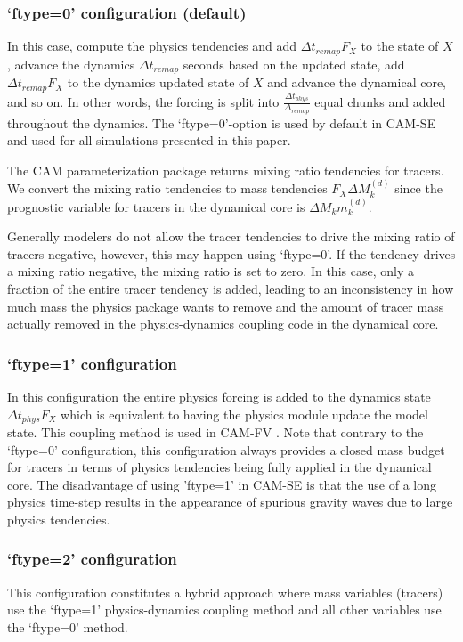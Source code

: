 \documentclass{agujournal}
\begin{document}
{\subsubsection{`ftype=0' configuration (default)}
In this case, compute the physics tendencies and add $\Delta t_{remap}F_X$ to the state of $X$, advance the dynamics $\Delta t_{remap}$ seconds based on the updated state, add $\Delta t_{remap}F_X$ to the dynamics updated state of $X$ and advance the dynamical core, and so on. In other words, the forcing is split into $\frac{\Delta t_{phys}}{\Delta_{remap}}$ equal chunks and added throughout the dynamics. The `ftype=0'-option is used by default in CAM-SE and used for all simulations presented in this paper.

The CAM parameterization package returns mixing ratio tendencies for tracers. We convert the mixing ratio tendencies to mass tendencies $F_X \Delta M^{(d)}_k$ since the prognostic variable for tracers in the dynamical core is $\Delta M_k m^{(d)}_k$.

Generally modelers do not allow the tracer tendencies to drive the mixing ratio of tracers negative, however, this may happen using `ftype=0'. If the tendency drives a mixing ratio negative, the mixing ratio is set to zero. In this case, only a fraction of the entire tracer tendency is added, leading to an inconsistency in how much mass the physics package wants to remove and the amount of tracer mass actually removed in the physics-dynamics coupling code in the dynamical core.
\subsubsection{`ftype=1' configuration}
In this configuration the entire physics forcing is added to the
dynamics state $\Delta t_{phys}F_X$ which is equivalent to having the
physics module update the model state. This coupling method is used in
CAM-FV \citep{L2004MWR}. Note that contrary to the `ftype=0'
configuration, this configuration always provides a closed mass budget
for tracers in terms of physics tendencies being fully applied in the
dynamical core. The disadvantage of using 'ftype=1' in CAM-SE is that
the use of a long physics time-step results in the appearance of
spurious gravity waves due to large physics tendencies.
\subsubsection{`ftype=2' configuration}
This configuration constitutes a hybrid approach where mass variables (tracers) use the `ftype=1' physics-dynamics coupling method and all other variables use the `ftype=0' method.


}
\end{document}
